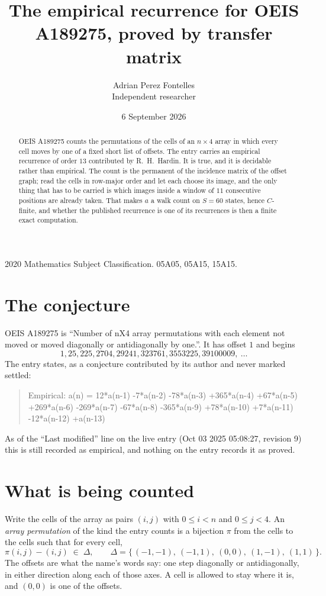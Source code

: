 \documentclass[11pt,a4paper]{article}
\title{The empirical recurrence for OEIS A189275, proved by transfer matrix}
\author{Adrian Perez Fontelles\\ \small Independent researcher}
\date{6 September 2026}
\theoremstyle{plain}
\theoremstyle{definition}
\begin{document}
\maketitle

\begin{abstract}
OEIS A189275 counts the permutations of the cells of an $n\times4$ array in which every cell
moves by one of a fixed short list of offsets. The entry carries an empirical recurrence of
order $13$ contributed by R.~H.~Hardin. It is true, and it is decidable rather than
empirical. The count is the permanent of the incidence matrix of the offset graph; read the
cells in row-major order and let each choose its image, and the only thing that has to be
carried is which images inside a window of $11$ consecutive positions are already taken.
That makes $a$ a walk count on $S=60$ states, hence $C$-finite, and whether the published
recurrence is one of its recurrences is then a finite exact computation.
\end{abstract}

\noindent\small 2020 Mathematics Subject Classification. 05A05, 05A15, 15A15.\normalsize

\section{The conjecture}

OEIS A189275 is ``Number of nX4 array permutations with each element not moved or moved diagonally or antidiagonally by one.''. It has offset $1$ and begins
\[
1, 25, 225, 2704, 29241, 323761, 3553225, 39100009,\ \dots
\]
The entry states, as a conjecture contributed by its author and never marked settled:
\begin{quote}
Empirical: a(n) = 12*a(n-1) -7*a(n-2) -78*a(n-3) +365*a(n-4) +67*a(n-5) +269*a(n-6) -269*a(n-7) -67*a(n-8) -365*a(n-9) +78*a(n-10) +7*a(n-11) -12*a(n-12) +a(n-13)
\end{quote}
As of the ``Last modified'' line on the live entry (Oct 03 2025 05:08:27, revision 9) this is still
recorded as empirical, and nothing on the entry records it as proved.

\section{What is being counted}

Write the cells of the array as pairs $(i,j)$ with $0\le i<n$ and $0\le j<4$. An
\emph{array permutation} of the kind the entry counts is a bijection $\pi$ from the cells to
the cells such that for every cell,
\[
\pi(i,j)-(i,j)\;\in\;\Delta,\qquad
\Delta=\{\,(-1,-1),\ (-1,1),\ (0,0),\ (1,-1),\ (1,1)\,\}.
\]
The offsets are what the name's words say: one step diagonally or antidiagonally, in either direction along each of those axes. A cell is allowed to stay where it is, and $(0,0)$ is one of the offsets.
\end{document}
